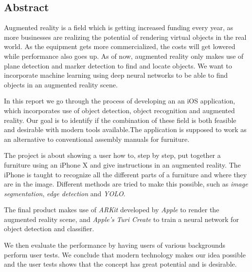 \begin{center}
\section*{Abstract}
\end{center}
Augmented reality is a field which is getting increased funding every year, as more businesses are realizing the potential of rendering virtual objects in the real world. As the equipment gets more commercialized, the costs will get lowered while performance also goes up. As of now, augmented reality only makes use of plane detection and marker detection to find and locate objects. We want to incorporate machine learning using deep neural networks to be able to find objects in an augmented reality scene. 

In this report we go through the process of developing an an iOS application, which incorporates use of object detection, object recognition and augmented reality. Our goal is to identify if the combination of these field is both feasible and desirable with modern tools available.The application is supposed to work as an alternative to conventional assembly manuals for furniture. 

The project is about showing a user how to, step by step, put together a furniture using an iPhone X and give instructions in an augmented reality.
The iPhone is taught to recognize all the different parts of a furniture and where they are in the image. Different methods are tried to make this possible, such as \textit{image segmentation}, \textit{edge detection} and \textit{YOLO}.

The final product makes use of \textit{ARKit} developed by \textit{Apple} to render the augmented reality scene, and \textit{Apple's} \textit{Turi Create} to train a neural network for object detection and classifier. 

We then evaluate the performance by having users of various backgrounds perform user tests. We conclude that modern technology makes our idea possible and the user tests shows that the concept has great potential and is desirable.
\newpage